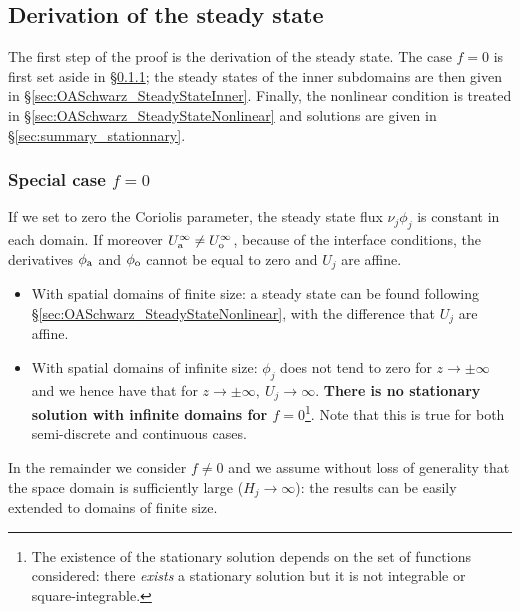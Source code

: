 \subsection{Derivation of the steady state}
\label{sec:OASchwarz_SteadyState}
The first step of the proof is the derivation of the
steady state. The case $f=0$ is first set aside in
\S\ref{sec:OASchwarz_SteadyStatef0}; the steady states of
the inner subdomains are then given in 
\S\ref{sec:OASchwarz_SteadyStateInner}.
Finally, the nonlinear condition is treated
in \S\ref{sec:OASchwarz_SteadyStateNonlinear}
and solutions are given in \S\ref{sec:summary_stationnary}.
\subsubsection{Special case $f=0$}
\label{sec:OASchwarz_SteadyStatef0}
If we set to zero the Coriolis parameter,
the steady state flux $\nu_j\phi_j$ is constant in each domain.
If moreover $U_{\rm a}^{\infty} \neq U_{\rm o}^{\infty}$,
because of the interface conditions,
the derivatives $\phi_{\rm a}$ and $\phi_{\rm o}$
cannot be equal to zero and $U_j$ are affine.
\begin{itemize}
	\item With spatial domains of finite size:
	a steady state can be found following
	\S\ref{sec:OASchwarz_SteadyStateNonlinear}, with
		the difference that $U_j$ are affine.
	\item With spatial domains of infinite size:
	$\phi_j$ does not tend to zero for
	$z\rightarrow \pm \infty$ and we hence have
	that for $z\rightarrow \pm \infty,~ U_j \rightarrow \infty$.
\textbf{There is no stationary solution with infinite domains
for $f=0$}\footnote{The existence of the stationary solution
depends on the set of functions considered: there
\textit{exists} a stationary solution but it is not
integrable or square-integrable.}.
Note that this is true for both semi-discrete
and continuous cases.
\end{itemize}
In the remainder we consider $f \neq 0$ and we assume without loss of
generality that the space domain is sufficiently
large ($H_j \rightarrow \infty$): the results can be easily
extended to domains of finite size.
